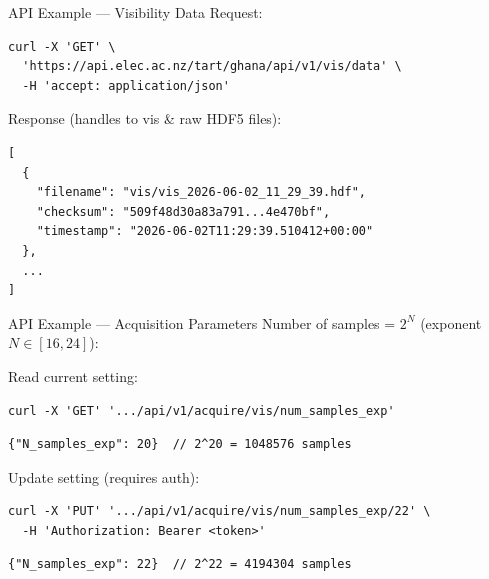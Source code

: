 \documentclass[ignorenonframetext]{beamer}
\begin{document}
\begin{frame}[fragile]{API Example --- Visibility Data}
	{\small Request:}
	\begin{lstlisting}[basicstyle=\ttfamily\scriptsize\color{white}, backgroundcolor=\color{black!85}, rulecolor=\color{black!50}, frame=single, framesep=0.4em, xleftmargin=0.5em, xrightmargin=0.5em]
curl -X 'GET' \
  'https://api.elec.ac.nz/tart/ghana/api/v1/vis/data' \
  -H 'accept: application/json'
	\end{lstlisting}

	\vspace{0.2cm}
	{\small Response (handles to vis \& raw HDF5 files):}
	\begin{lstlisting}[basicstyle=\ttfamily\scriptsize\color{black!85}, backgroundcolor=\color{gray!8}, rulecolor=\color{gray!40}, frame=single, framesep=0.4em, xleftmargin=0.5em, xrightmargin=0.5em]
[
  {
    "filename": "vis/vis_2026-06-02_11_29_39.hdf",
    "checksum": "509f48d30a83a791...4e470bf",
    "timestamp": "2026-06-02T11:29:39.510412+00:00"
  },
  ...
]
	\end{lstlisting}
\end{frame}

\begin{frame}[fragile]{API Example --- Acquisition Parameters}
	{\small Number of samples = $2^N$ (exponent $N \in [16, 24]$):}

	\vspace{0.3cm}
	{\small Read current setting:}
	\begin{lstlisting}[basicstyle=\ttfamily\scriptsize\color{white}, backgroundcolor=\color{black!85}, rulecolor=\color{black!50}, frame=single, framesep=0.4em, xleftmargin=0.5em, xrightmargin=0.5em]
curl -X 'GET' '.../api/v1/acquire/vis/num_samples_exp'
	\end{lstlisting}
	\begin{lstlisting}[basicstyle=\ttfamily\scriptsize\color{black!85}, backgroundcolor=\color{gray!8}, rulecolor=\color{gray!40}, frame=single, framesep=0.4em, xleftmargin=0.5em, xrightmargin=0.5em]
{"N_samples_exp": 20}  // 2^20 = 1048576 samples
	\end{lstlisting}

	\vspace{0.3cm}
	{\small Update setting (requires auth):}
	\begin{lstlisting}[basicstyle=\ttfamily\scriptsize\color{white}, backgroundcolor=\color{black!85}, rulecolor=\color{black!50}, frame=single, framesep=0.4em, xleftmargin=0.5em, xrightmargin=0.5em]
curl -X 'PUT' '.../api/v1/acquire/vis/num_samples_exp/22' \
  -H 'Authorization: Bearer <token>'
	\end{lstlisting}
	\begin{lstlisting}[basicstyle=\ttfamily\scriptsize\color{black!85}, backgroundcolor=\color{gray!8}, rulecolor=\color{gray!40}, frame=single, framesep=0.4em, xleftmargin=0.5em, xrightmargin=0.5em]
{"N_samples_exp": 22}  // 2^22 = 4194304 samples
	\end{lstlisting}
\end{frame}
\end{document}
